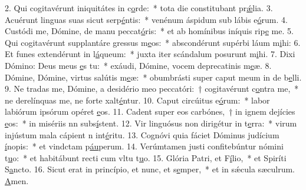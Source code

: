 2. Qui cogitavérunt iniquitátes in c\uline{o}rde:~* tota die constitubant pr\uline{ǽ}lia.
3. Acuérunt linguas suas sicut serp\uline{é}ntis:~* venénum áspidum sub lábis e\uline{ó}rum.
4. Custódi me, Dómine, de manu peccat\uline{ó}ris:~* et ab homínibus iníquis rip\uline{e} me.
5. Qui cogitavérunt supplantáre gressus m\uline{e}os:~* abscondérunt supérbi láum m\uline{i}hi:
6. Et funes extendérunt in l\uline{á}queum:~* juxta iter scándalum posurunt m\uline{i}hi.
7. Dixi Dómino: Deus meus \uline{e}s tu:~* exáudi, Dómine, vocem deprecatinis m\uline{e}æ.
8. Dómine, Dómine, virtus salútis m\uline{e}æ:~* obumbrásti super caput meum in de b\uline{e}lli.
9. Ne tradas me, Dómine, a desidério meo peccatóri:~† cogitavérunt c\uline{o}ntra me,~* ne derelínquas me, ne forte xalt\uline{é}ntur.
10. Caput circúitus e\uline{ó}rum:~* labor labiórum ipsórum opéret \uline{e}os.
11. Cadent super eos carbónes,~† in ignem dejícies \uline{e}os:~* in misériis nn subs\uline{í}stent.
12. Vir linguósus non dirigétur in t\uline{e}rra:~* virum injústum mala cápient n int\uline{é}ritu.
13. Cognóvi quia fáciet Dóminus judícium \uline{í}nopis:~* et vindctam p\uline{áu}perum.
14. Verúmtamen justi confitebúntur nómini t\uline{u}o:~* et habitábunt recti cum vltu t\uline{u}o.
15. Glória Patri, et F\uline{í}lio,~* et Spiríti S\uline{a}ncto.
16. Sicut erat in princípio, et nunc, et s\uline{e}mper,~* et in sǽcula sæculrum. \uline{A}men.
